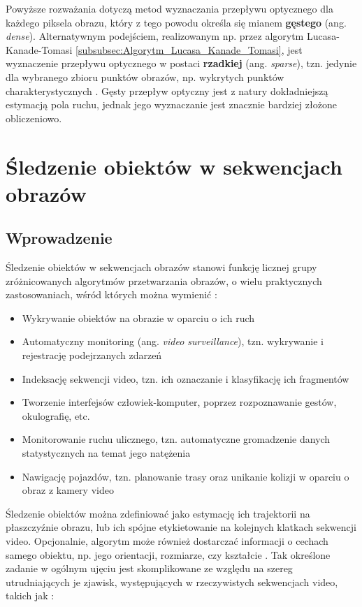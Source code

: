 Powyższe rozważania dotyczą metod wyznaczania przepływu optycznego dla każdego piksela obrazu, który z tego powodu określa się mianem \textbf{gęstego} (ang. \textit{dense}). Alternatywnym podejściem, realizowanym np. przez algorytm Lucasa-Kanade-Tomasi \ref{subsubsec:Algorytm_Lucasa_Kanade_Tomasi}, jest wyznaczenie przepływu optycznego w postaci \textbf{rzadkiej} (ang. \textit{sparse}), tzn. jedynie dla wybranego zbioru punktów obrazów, np. wykrytych punktów charakterystycznych \cite{Karasulu2013}. Gęsty przepływ optyczny jest z natury dokładniejszą estymacją pola ruchu, jednak jego wyznaczanie jest znacznie bardziej złożone obliczeniowo. 

\section{Śledzenie obiektów w sekwencjach obrazów}
\label{sec:Sledzenie_obiektow_w_sekwenjach_obrazow}

\subsection{Wprowadzenie}
\label{subsec:Sledzenie_obiektow_w_sekwencjach_obrazow_wprowadzenie}
Śledzenie obiektów w sekwencjach obrazów stanowi funkcję licznej grupy zróżnicowanych algorytmów przetwarzania obrazów, o wielu praktycznych zastosowaniach, wśród których można wymienić \cite{Yilmaz2006}:

\begin{itemize}

	\item Wykrywanie obiektów na obrazie w oparciu o ich ruch
	\item Automatyczny monitoring (ang. \textit{video surveillance}), tzn. wykrywanie i rejestrację podejrzanych zdarzeń
	\item Indeksację sekwencji video, tzn. ich oznaczanie i klasyfikację ich fragmentów
	\item Tworzenie interfejsów człowiek-komputer, poprzez rozpoznawanie gestów, okulografię, etc.
	\item Monitorowanie ruchu ulicznego, tzn. automatyczne gromadzenie danych statystycznych na temat jego natężenia
	\item Nawigację pojazdów, tzn. planowanie trasy oraz unikanie kolizji w oparciu o obraz z kamery video

\end{itemize}	
	
Śledzenie obiektów można zdefiniować jako estymację ich trajektorii na  płaszczyźnie obrazu, lub ich spójne etykietowanie na kolejnych klatkach sekwencji video. Opcjonalnie, algorytm może również dostarczać informacji o cechach samego obiektu, np. jego orientacji, rozmiarze, czy kształcie \cite{Yilmaz2006}. Tak określone zadanie w ogólnym ujęciu jest skomplikowane ze względu na szereg utrudniających je zjawisk, występujących w rzeczywistych sekwencjach video, takich jak \cite{Yilmaz2006}:

